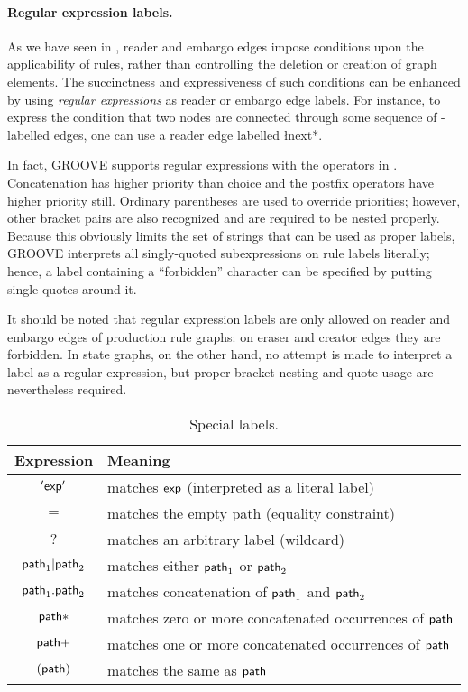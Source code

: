 \paragraph{Regular expression labels.}

As we have seen in , reader and embargo edges impose
conditions upon the applicability of rules, rather than controlling the
deletion or creation of graph elements. The succinctness and expressiveness of
such conditions can be enhanced by using \emph{regular expressions} as reader
or embargo edge labels. For instance, to express the condition that two nodes
are connected through some sequence of \nextL-labelled edges, one can use a
reader edge labelled \l{next*}.

In fact, GROOVE supports regular expressions with the operators in
. Concatenation has higher priority than choice and the postfix
operators have higher priority still. Ordinary parentheses are used to override
priorities; however, other bracket pairs are also recognized and are required
to be nested properly. Because this obviously limits the set of strings that
can be used as proper labels, GROOVE interprets all singly-quoted subexpressions on
rule labels literally; hence, a label containing a ``forbidden'' character can
be specified by putting single quotes around it.

It should be noted that regular expression labels are only allowed on reader
and embargo edges of production rule graphs: on eraser and creator edges they
are forbidden. In state graphs, on the other hand, no attempt is made to
interpret a label as a regular expression, but proper bracket nesting and quote
usage are nevertheless required.
%
\begin{table}
\begin{center}
\begin{tabular}{|c|l|}
\hline\hline
\bf Expression & \bf Meaning \\
\hline
$'\mathsf{exp}'$ & matches $\mathsf{exp}$ (interpreted as a literal label) \\
$=$ & matches the empty path (equality constraint) \\
$?$ & matches an arbitrary label (wildcard) \\
\hline
$\mathsf{path}_1|\mathsf{path}_2$ & matches either $\mathsf{path}_1$ or $\mathsf{path}_2$ \\
$\mathsf{path}_1.\mathsf{path}_2$ & matches concatenation of $\mathsf{path}_1$ and $\mathsf{path}_2$ \\
\hline
$\mathsf{path}{*}$ & matches zero or more concatenated occurrences of $\mathsf{path}$ \\
$\mathsf{path}{+}$ & matches one or more concatenated occurrences of $\mathsf{path}$ \\
\hline
$(\mathsf{path})$ & matches the same as $\mathsf{path}$ \\
\hline
\hline\hline
\end{tabular}
\end{center}
\caption{Special labels.}
\end{table}


